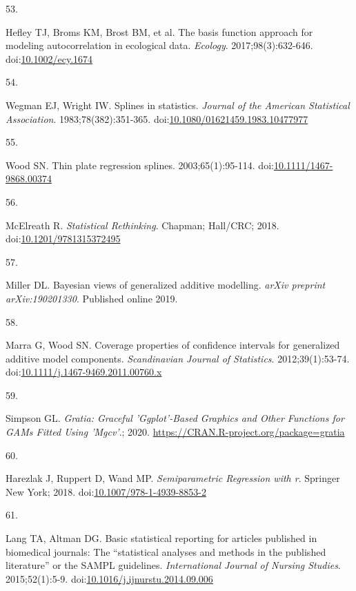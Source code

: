 \documentclass[
]{article}
\newlength{\cslhangindent}
\newlength{\csllabelwidth}
\newlength{\cslentryspacingunit} %
\newenvironment{CSLReferences}[2] %
 {%
  \setlength{\parindent}{0pt}
  \ifodd #1
  \let\oldpar\par
  \def\par{\hangindent=\cslhangindent\oldpar}
  \fi
  \setlength{\parskip}{#2\cslentryspacingunit}
 }%
 {}
\newcommand{\CSLLeftMargin}[1]{\parbox[t]{\csllabelwidth}{#1}}
\newcommand{\CSLRightInline}[1]{\parbox[t]{\linewidth - \csllabelwidth}{#1}\break}
\begin{document}
\begin{CSLReferences}{0}{0}
\leavevmode{}%
\CSLLeftMargin{53. }
\CSLRightInline{Hefley TJ, Broms KM, Brost BM, et al. The basis function approach for modeling autocorrelation in ecological data. \emph{Ecology}. 2017;98(3):632-646. doi:\href{https://doi.org/10.1002/ecy.1674}{10.1002/ecy.1674}}

\leavevmode{}%
\CSLLeftMargin{54. }
\CSLRightInline{Wegman EJ, Wright IW. Splines in statistics. \emph{Journal of the American Statistical Association}. 1983;78(382):351-365. doi:\href{https://doi.org/10.1080/01621459.1983.10477977}{10.1080/01621459.1983.10477977}}

\leavevmode{}%
\CSLLeftMargin{55. }
\CSLRightInline{Wood SN. Thin plate regression splines. 2003;65(1):95-114. doi:\href{https://doi.org/10.1111/1467-9868.00374}{10.1111/1467-9868.00374}}

\leavevmode{}%
\CSLLeftMargin{56. }
\CSLRightInline{McElreath R. \emph{Statistical Rethinking}. Chapman; Hall/{CRC}; 2018. doi:\href{https://doi.org/10.1201/9781315372495}{10.1201/9781315372495}}

\leavevmode{}%
\CSLLeftMargin{57. }
\CSLRightInline{Miller DL. Bayesian views of generalized additive modelling. \emph{arXiv preprint arXiv:190201330}. Published online 2019.}

\leavevmode{}%
\CSLLeftMargin{58. }
\CSLRightInline{Marra G, Wood SN. Coverage properties of confidence intervals for generalized additive model components. \emph{Scandinavian Journal of Statistics}. 2012;39(1):53-74. doi:\href{https://doi.org/10.1111/j.1467-9469.2011.00760.x}{10.1111/j.1467-9469.2011.00760.x}}

\leavevmode{}%
\CSLLeftMargin{59. }
\CSLRightInline{Simpson GL. \emph{Gratia: Graceful 'Ggplot'-Based Graphics and Other Functions for GAMs Fitted Using 'Mgcv'}.; 2020. \url{https://CRAN.R-project.org/package=gratia}}

\leavevmode{}%
\CSLLeftMargin{60. }
\CSLRightInline{Harezlak J, Ruppert D, Wand MP. \emph{Semiparametric Regression with r}. Springer New York; 2018. doi:\href{https://doi.org/10.1007/978-1-4939-8853-2}{10.1007/978-1-4939-8853-2}}

\leavevmode{}%
\CSLLeftMargin{61. }
\CSLRightInline{Lang TA, Altman DG. Basic statistical reporting for articles published in biomedical journals: The {``}statistical analyses and methods in the published literature{''} or the {SAMPL} guidelines. \emph{International Journal of Nursing Studies}. 2015;52(1):5-9. doi:\href{https://doi.org/10.1016/j.ijnurstu.2014.09.006}{10.1016/j.ijnurstu.2014.09.006}}


\end{CSLReferences}
\end{document}
